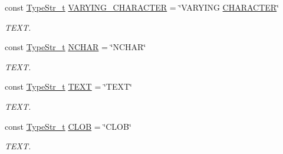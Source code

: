 \begin{DoxyCompactItemize}
\mbox{\label{namespacesf_1_1sql__types_a44a2285e57db6a434e1f6bf73df9447e}} 
const \hyperlink{namespacesf_1_1sql__types_a1a4f114cdf79706d2298e3454006e65b}{Type\+Str\+\_\+t} \hyperlink{namespacesf_1_1sql__types_a44a2285e57db6a434e1f6bf73df9447e}{V\+A\+R\+Y\+I\+N\+G\+\_\+\+C\+H\+A\+R\+A\+C\+T\+ER} = \char`\"{}V\+A\+R\+Y\+I\+NG \hyperlink{namespacesf_1_1sql__types_abfa2105dba94d6f9d68be6acf362e0ef}{C\+H\+A\+R\+A\+C\+T\+ER}\char`\"{}
\begin{DoxyCompactList}\small\item\em T\+E\+XT. \end{DoxyCompactList}\item 
\mbox{\label{namespacesf_1_1sql__types_a148a7bc22a7b7505d4b063defbca32eb}} 
const \hyperlink{namespacesf_1_1sql__types_a1a4f114cdf79706d2298e3454006e65b}{Type\+Str\+\_\+t} \hyperlink{namespacesf_1_1sql__types_a148a7bc22a7b7505d4b063defbca32eb}{N\+C\+H\+AR} = \char`\"{}N\+C\+H\+AR\char`\"{}
\begin{DoxyCompactList}\small\item\em T\+E\+XT. \end{DoxyCompactList}\item 
\mbox{\label{namespacesf_1_1sql__types_a0b2ac3e64bad9d7879066990a24b2dfe}} 
const \hyperlink{namespacesf_1_1sql__types_a1a4f114cdf79706d2298e3454006e65b}{Type\+Str\+\_\+t} \hyperlink{namespacesf_1_1sql__types_a0b2ac3e64bad9d7879066990a24b2dfe}{T\+E\+XT} = \char`\"{}T\+E\+XT\char`\"{}
\begin{DoxyCompactList}\small\item\em T\+E\+XT. \end{DoxyCompactList}\item 
\mbox{\label{namespacesf_1_1sql__types_a8b91e777ea6e995b204dfcc6315948f8}} 
const \hyperlink{namespacesf_1_1sql__types_a1a4f114cdf79706d2298e3454006e65b}{Type\+Str\+\_\+t} \hyperlink{namespacesf_1_1sql__types_a8b91e777ea6e995b204dfcc6315948f8}{C\+L\+OB} = \char`\"{}C\+L\+OB\char`\"{}
\begin{DoxyCompactList}\small\item\em T\+E\+XT. \end{DoxyCompactList}\item 
\mbox{\label{namespacesf_1_1sql__types_a27db7db3803af68b095e51d281ba0abc}} 

\end{DoxyCompactItemize}
